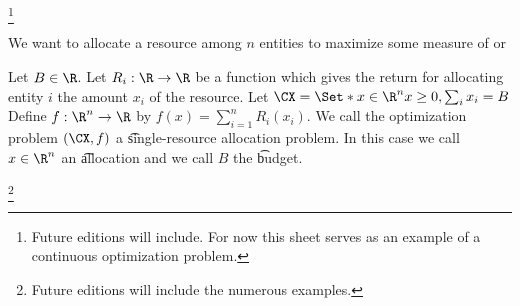 
  \ifhmode\unskip\fi\footnote{
Future editions will include. For now this sheet serves as an example of a continuous optimization problem.
  }


We want to allocate a resource among $n$ entities to maximize some measure of  or 

Let $B \in \R$.
Let $R_i: \R \to \R$ be a function which gives the return for allocating entity $i$ the amount $x_i$ of the resource.
Let $\CX = \Set*{x \in \R^n}{x \geq 0, \sum_{i}x_i = B}$
Define $f: \R^n \to \R$ by $f(x) = \sum_{i = 1}^{n} R_i(x_i)$.
We call the optimization problem $(\CX, f)$ a \t{single-resource allocation problem}.
In this case we call $x \in \R^{n}$ an \t{allocation} and we call $B$ the \t{budget}.

  \ifhmode\unskip\fi\footnote{
Future editions will include the numerous examples.
  }

\blankpage

